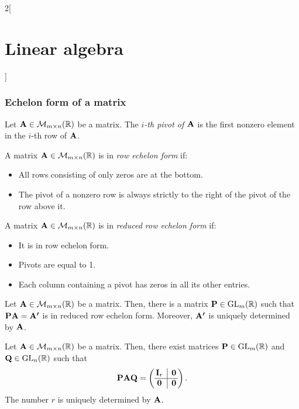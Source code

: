 \documentclass[../../../main.tex]{subfiles}
\begin{document}
\begin{multicols}{2}[\section{Linear algebra}]
    \subsubsection*{Echelon form of a matrix}
    \begin{definition}
        Let $\boldsymbol{\mathrm{A}}\in\mathcal{M}_{m\times n}(\mathbb{R})$ be a matrix. The \textit{$i$-th pivot of $\boldsymbol{\mathrm{A}}$} is the first nonzero element in the $i$-th row of $\boldsymbol{\mathrm{A}}$.
    \end{definition}
    \begin{definition}
        A matrix $\boldsymbol{\mathrm{A}}\in\mathcal{M}_{m\times n}(\mathbb{R})$ is in \textit{row echelon form} if:
        \begin{itemize}
            \item All rows consisting of only zeros are at the bottom.
            \item The pivot of a nonzero row is always strictly to the right of the pivot of the row above it.
        \end{itemize}
    \end{definition}
    \begin{definition}
        A matrix $\boldsymbol{\mathrm{A}}\in\mathcal{M}_{m\times n}(\mathbb{R})$ is in \textit{reduced row echelon form} if:
        \begin{itemize}
            \item It is in row echelon form.
            \item Pivots are equal to 1.
            \item Each column containing a pivot has zeros in all its other entries.
        \end{itemize}
    \end{definition}
    \begin{theorem}
        Let $\boldsymbol{\mathrm{A}}\in\mathcal{M}_{m\times n}(\mathbb{R})$ be a matrix. Then, there is a matrix $\boldsymbol{\mathrm{P}}\in\mathrm{GL}_m(\mathbb{R})$ such that $\boldsymbol{\mathrm{P}}\boldsymbol{\mathrm{A}}=\boldsymbol{\mathrm{A'}}$ is in reduced row echelon form. Moreover, $\boldsymbol{\mathrm{A'}}$ is uniquely determined by $\boldsymbol{\mathrm{A}}$.
    \end{theorem}
    \begin{theorem}
        Let $\boldsymbol{\mathrm{A}}\in\mathcal{M}_{m\times n}(\mathbb{R})$ be a matrix. Then, there exist matrices $\boldsymbol{\mathrm{P}}\in\mathrm{GL}_m(\mathbb{R})$ and $\boldsymbol{\mathrm{Q}}\in\mathrm{GL}_n(\mathbb{R})$ such that
        $$\vectorfunction{P}\vectorfunction{A}\vectorfunction{Q}=\left(
            \begin{array}{@{\,} c|c @{\,}}
                    \vectorfunction{I}_r & \vectorfunction{0} \\
                    \hline
                    \vectorfunction{0}   & \vectorfunction{0}
                \end{array}
            \right).$$
        The number $r$ is uniquely determined by $\boldsymbol{\mathrm{A}}$.
    \end{theorem}

\end{multicols}
\end{document}

